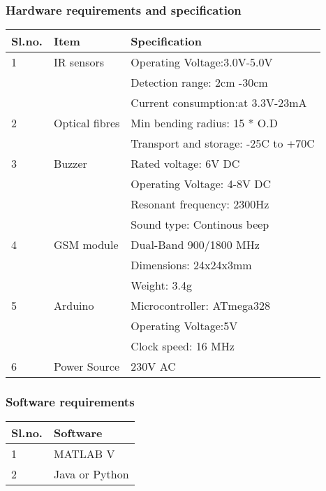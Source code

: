 \documentclass{beamer}
\begin{document}
\begin{frame}
	\frametitle{Hardware requirements and specification}
		\begin{tabular}{|l|l|l|}
			\hline
			Sl.no. & Item           & Specification                                  \\ \hline
			1      & IR sensors     & Operating Voltage:3.0V-5.0V                    \\
			       &                & Detection range: 2cm -30cm                     \\
			       &                & Current consumption:at 3.3V-23mA				 \\
			2      & Optical fibres & Min bending radius: 15 * O.D                   \\
		           &                &Transport and storage: -25C to +70C             \\
			3      & Buzzer         & Rated voltage: 6V DC                           \\
			       &                & Operating Voltage: 4-8V DC                     \\
			       &                & Resonant frequency: 2300Hz                     \\
			       &                & Sound type: Continous beep                     \\
			4      & GSM module     &Dual-Band 900/1800 MHz                          \\
			       &                &Dimensions: 24x24x3mm                           \\
			       &                &Weight: 3.4g                                    \\
			5      & Arduino        &Microcontroller: ATmega328                      \\
			       &                &Operating Voltage:5V                            \\
			       &                &Clock speed: 16 MHz                             \\
			6      & Power Source   &230V AC                                         \\ \hline
		\end{tabular}
\end{frame}
\begin{frame}
	\frametitle{Software requirements}
		\begin{tabular}{|l|l|}
	\hline
	Sl.no. & Software         \\ \hline
	1      & MATLAB V                    \\
	2      & Java or Python                  \\ \hline
		\end{tabular}
\end{frame}
\end{document}
